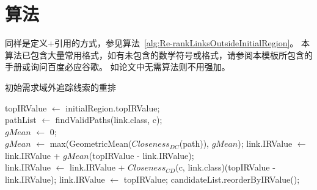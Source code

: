 \chapter{算法}

同样是定义+引用的方式，参见算法~\ref{alg:Re-rankLinksOutsideInitialRegion}。
本算法已包含大量常用格式，如有未包含的数学符号或格式，请参阅本模板所包含的手册或询问百度必应谷歌。
如论文中无需算法则不用强加。

\begin{algorithm}[htbp]
\caption{初始需求域外追踪线索的重排}
\label{alg:Re-rankLinksOutsideInitialRegion}
topIRValue $\leftarrow$ initialRegion.topIRValue;\\
 {
   {
       {
          pathList $\leftarrow$ findValidPaths(link.class, c);\\
            $gMean$ $\leftarrow$ 0;\\
             {
              $gMean$ $\leftarrow$ max(GeometricMean($Closeness_{DC}$(path)), $gMean$);
            }
            link.IRValue $\leftarrow$ link.IRValue + $gMean$(topIRValue - link.IRValue);\\
             {
              link.IRValue $\leftarrow$ link.IRValue + $Closeness_{CD}$(c, link.class)(topIRValue - link.IRValue);
            }
        }
         {
          link.IRValue $\leftarrow$ topIRValue;
        }
    }
}
candidateList.reorderByIRValue();
\end{algorithm}